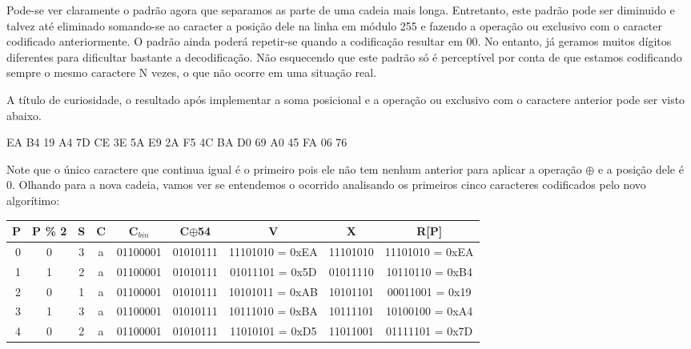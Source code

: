 Pode-se ver claramente o padrão agora que separamos as parte de uma cadeia mais longa. Entretanto, este padrão pode ser diminuido e talvez até eliminado somando-se ao caracter a posição dele na linha em módulo 255 e fazendo a operação ou exclusivo com o caracter codificado anteriormente. O padrão ainda poderá repetir-se quando a codificação resultar em 00. No entanto, já geramos muitos dígitos diferentes para dificultar bastante a decodificação. Não esquecendo que este  padrão só é perceptível por conta de que estamos codificando sempre o mesmo caractere N vezes, o que não ocorre em uma situação real.

A título de curiosidade, o resultado após implementar a soma posicional e a operação ou exclusivo com o caractere anterior pode ser visto abaixo.
\begin{center}
EA B4 19 A4 7D CE 3E 5A E9 2A F5 4C BA D0 69 A0 45 FA 06 76
\end{center}
Note que o único caractere que continua igual é o primeiro pois ele não tem nenhum anterior para aplicar a operação $ \oplus $ e a posição dele é 0. Olhando para a nova cadeia, vamos ver se entendemos o ocorrido analisando os primeiros cinco caracteres codificados pelo novo algorítimo:

\footnotesize
\noindent%
\begin{tabular}{@{}|r|c|c|c|c|c|c|c||c||}
\hline
P & P \% 2 & S & C & C$_{bin}$ & C$ \oplus $54 & V & X & R[P]\\
\hline
0 & 0 & 3 & a & 01100001 & 01010111 & 11101010 = 0xEA & 11101010 & 11101010 = 0xEA \\
1 & 1 & 2 & a & 01100001 & 01010111 & 01011101 = 0x5D & 01011110 & 10110110 = 0xB4 \\
2 & 0 & 1 & a & 01100001 & 01010111 & 10101011 = 0xAB & 10101101 & 00011001 = 0x19 \\
3 & 1 & 3 & a & 01100001 & 01010111 & 10111010 = 0xBA & 10111101 & 10100100 = 0xA4 \\
4 & 0 & 2 & a & 01100001 & 01010111 & 11010101 = 0xD5 & 11011001 & 01111101 = 0x7D \\
\hline
\end{tabular}
\normalsize

